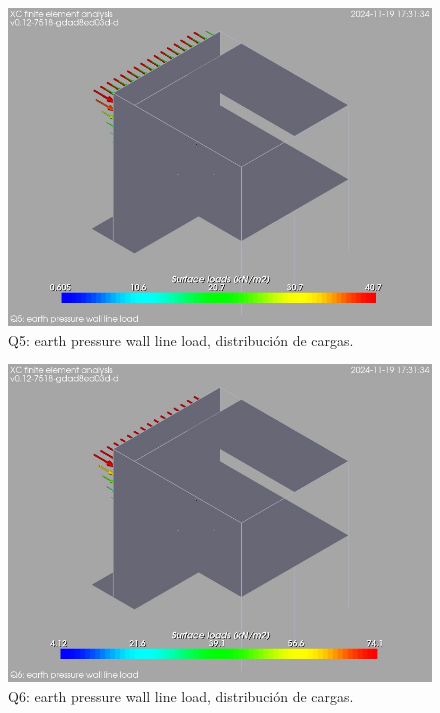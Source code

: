 \begin{figure}[ht]
\begin{center}
\includegraphics[width=\linewidth]{results/graphics/loads/QearthPWallLinLoverallSet}
\caption{Q5: earth pressure wall line load, distribución de cargas.}
\label{QearthPWallLinLoverallSet}
\end{center}
\end{figure}
\begin{figure}[ht]
\begin{center}
\includegraphics[width=\linewidth]{results/graphics/loads/QearthPWallHrzLoverallSet}
\caption{Q6: earth pressure wall line load, distribución de cargas.}
\label{QearthPWallHrzLoverallSet}
\end{center}
\end{figure}
